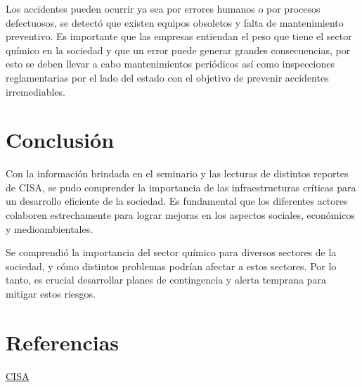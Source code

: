 \documentclass{article}
\begin{document}
Los accidentes pueden ocurrir ya sea por errores humanos o por procesos
defectuosos, se detectó que existen equipos obsoletos y falta de
mantenimiento preventivo. Es importante que las empresas entiendan el
peso que tiene el sector químico en la sociedad y que un error puede
generar grandes consecuencias, por esto se deben llevar a cabo
mantenimientos periódicos así como inspecciones reglamentarias por el
lado del estado con el objetivo de prevenir accidentes irremediables.

\hypertarget{conclusiuxf3n}{%
\section{Conclusión}\label{conclusiuxf3n}}

Con la información brindada en el seminario y las lecturas de distintos
reportes de CISA, se pudo comprender la importancia de las
infraestructuras críticas para un desarrollo eficiente de la sociedad.
Es fundamental que los diferentes actores colaboren estrechamente para
lograr mejoras en los aspectos sociales, económicos y medioambientales.

Se comprendió la importancia del sector químico para diversos sectores
de la sociedad, y cómo distintos problemas podrían afectar a estos
sectores. Por lo tanto, es crucial desarrollar planes de contingencia y
alerta temprana para mitigar estos riesgos.

\hypertarget{referencias}{%
\section{Referencias}\label{referencias}}

\href{https://www.cisa.gov/topics/critical-infrastructure-security-and-resilience/critical-infrastructure-sectors/chemical-sector}{CISA}



\end{document}
